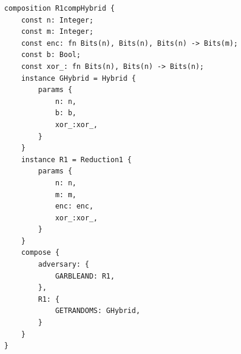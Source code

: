 \begin{longlisting}
\begin{verbatim}
composition R1compHybrid {
    const n: Integer; 
    const m: Integer;  
    const enc: fn Bits(n), Bits(n), Bits(n) -> Bits(m); 
    const b: Bool; 
    const xor_: fn Bits(n), Bits(n) -> Bits(n);
    instance GHybrid = Hybrid {
        params {
            n: n,
            b: b,
            xor_:xor_,
        }
    }
    instance R1 = Reduction1 {
        params {
            n: n,
            m: m,
            enc: enc,
            xor_:xor_,
        }
    }
    compose {
        adversary: {
            GARBLEAND: R1,
        },
        R1: {
            GETRANDOMS: GHybrid,
        }
    }
}
\end{verbatim}
\caption{Composition }
\label{lst:domino-composition-r1comphybrid}
\end{longlisting}